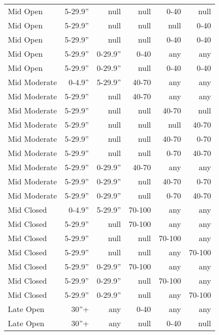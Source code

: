 \begin{table}[]
\begin{tabular}{@{}lrrrrr@{}}
Mid Open         & 5-29.9''        & null    & null   & 0-40   & null   \\
Mid Open         & 5-29.9''        & null    & null   & null   & 0-40   \\
Mid Open         & 5-29.9''        & null    & null   & 0-40   & 0-40   \\
Mid Open         & 5-29.9''        & 0-29.9'' & 0-40   & any    & any    \\
Mid Open         & 5-29.9''        & 0-29.9'' & null   & 0-40   & 0-40   \\
Mid Moderate     & 0-4.9''         & 5-29.9'' & 40-70  & any    & any    \\
Mid Moderate     & 5-29.9''        & null    & 40-70  & any    & any    \\
Mid Moderate     & 5-29.9''        & null    & null   & 40-70  & null   \\
Mid Moderate     & 5-29.9''        & null    & null   & null   & 40-70  \\
Mid Moderate     & 5-29.9''        & null    & null   & 40-70  & 0-70   \\
Mid Moderate     & 5-29.9''        & null    & null   & 0-70   & 40-70  \\
Mid Moderate     & 5-29.9''        & 0-29.9'' & 40-70  & any    & any    \\
Mid Moderate     & 5-29.9''        & 0-29.9'' & null   & 40-70  & 0-70   \\
Mid Moderate     & 5-29.9''        & 0-29.9'' & null   & 0-70   & 40-70  \\
Mid Closed       & 0-4.9''         & 5-29.9'' & 70-100 & any    & any    \\
Mid Closed       & 5-29.9''        & null    & 70-100 & any    & any    \\
Mid Closed       & 5-29.9''        & null    & null   & 70-100 & any    \\
Mid Closed       & 5-29.9''        & null    & null   & any    & 70-100 \\
Mid Closed       & 5-29.9''        & 0-29.9'' & 70-100 & any    & any    \\
Mid Closed       & 5-29.9''        & 0-29.9'' & null   & 70-100 & any    \\
Mid Closed       & 5-29.9''        & 0-29.9'' & null   & any    & 70-100 \\
Late Open        & 30''+           & any     & 0-40   & any    & any    \\
Late Open        & 30''+           & any     & null   & 0-40   & null   \\

\end{tabular}
\end{table}
